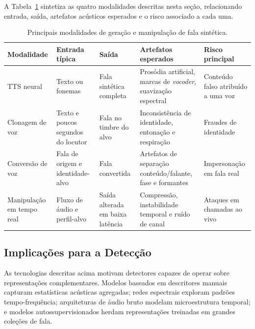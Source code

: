 \documentclass[12pt,a4paper]{article}
\begin{document}
A Tabela~\ref{tab:tipos_sintese_ataque} sintetiza as quatro modalidades
descritas nesta seção, relacionando entrada, saída, artefatos acústicos
esperados e o risco associado a cada uma.

\begin{table}[H]
	\centering
	\caption{Principais modalidades de geração e manipulação de fala sintética.}
	\label{tab:tipos_sintese_ataque}
	\footnotesize\singlespacing
	\setlength{\tabcolsep}{3pt}
	\begin{tabular}{@{}>{\raggedright\arraybackslash}p{2.4cm}
			>{\raggedright\arraybackslash}p{2.7cm}
			>{\raggedright\arraybackslash}p{2.8cm}
			>{\raggedright\arraybackslash}p{3.2cm}
			>{\raggedright\arraybackslash}p{2.6cm}@{}}
		\toprule
		\textbf{Modalidade} & \textbf{Entrada típica} & \textbf{Saída} &
		\textbf{Artefatos esperados} & \textbf{Risco principal} \\
		\midrule
		TTS neural & Texto ou fonemas & Fala sintética completa &
		Prosódia artificial, marcas de \textit{vocoder}, suavização espectral &
		Conteúdo falso atribuído a uma voz \\
		\addlinespace
		Clonagem de voz & Texto e poucos segundos do locutor & Fala no timbre do alvo &
		Inconsistência de identidade, entonação e respiração & Fraudes de identidade \\
		\addlinespace
		Conversão de voz & Fala de origem e identidade-alvo & Fala convertida &
		Artefatos de separação conteúdo/falante, fase e formantes & Impersonação em fala real \\
		\addlinespace
		Manipulação em tempo real & Fluxo de áudio e perfil-alvo & Saída alterada em baixa latência &
		Compressão, instabilidade temporal e ruído de canal & Ataques em chamadas ao vivo \\
		\bottomrule
	\end{tabular}
\end{table}

\subsection{Implicações para a Detecção}
\label{sec:metodos_atuais}

As tecnologias descritas acima motivam detectores capazes de operar sobre
representações complementares. Modelos baseados em descritores manuais capturam
estatísticas acústicas agregadas; redes espectrais exploram padrões
tempo-frequência; arquiteturas de áudio bruto modelam microestrutura temporal;
e modelos autossupervisionados herdam representações treinadas em grandes
coleções de fala.
\end{document}
